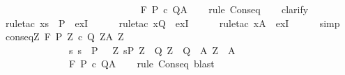 \begin{isabellebody}
\ \ \ \ \ \ \ \ \ \ \ \ \ \ {\isasymLongrightarrow}\isanewline
\ \ \ \ \ \ \ \ \ \ \ \ \ \ {\isasymGamma}{\isacharcomma}{\isasymTheta}{\isasymturnstile}\isactrlbsub {\isacharslash}F\isactrlesub \ P\ c\ Q{\isacharcomma}A{\isachardoublequoteclose}\isanewline
%
\isadelimproof
\ \ %
\endisadelimproof
%
\isatagproof
{}\isamarkupfalse%
\ {\isacharparenleft}rule\ Conseq{\isacharparenright}\isanewline
\ \ \isamarkupfalse%
\ clarify\isanewline
\ \ \isamarkupfalse%
\ {\isacharparenleft}rule{\isacharunderscore}tac\ x{\isacharequal}{\isachardoublequoteopen}{\isacharbraceleft}s{\isacharbraceright}\ {\isasyminter}\ P{\isachardoublequoteclose}\ \ exI{\isacharparenright}\ \ \isanewline
\ \ \isamarkupfalse%
\ {\isacharparenleft}rule{\isacharunderscore}tac\ x{\isacharequal}{\isachardoublequoteopen}Q{\isachardoublequoteclose}\ \ exI{\isacharparenright}\ \ \isanewline
\ \ \isamarkupfalse%
\ {\isacharparenleft}rule{\isacharunderscore}tac\ x{\isacharequal}{\isachardoublequoteopen}A{\isachardoublequoteclose}\ \ exI{\isacharparenright}\ \ \isanewline
\ \ \isamarkupfalse%
\ simp%
\endisatagproof
{\isafoldproof}%
%
\isadelimproof
\isanewline
%
\endisadelimproof
\isanewline
\isanewline
{}\isamarkupfalse%
\ conseq{\isacharcolon}{\isachardoublequoteopen}{\isasymlbrakk}{\isasymforall}Z{\isachardot}\ {\isasymGamma}{\isacharcomma}{\isasymTheta}{\isasymturnstile}\isactrlbsub {\isacharslash}F\isactrlesub \ {\isacharparenleft}P{\isacharprime}\ Z{\isacharparenright}\ c\ {\isacharparenleft}Q{\isacharprime}\ Z{\isacharparenright}{\isacharcomma}{\isacharparenleft}A{\isacharprime}\ Z{\isacharparenright}{\isacharsemicolon}\isanewline
\ \ \ \ \ \ \ \ \ \ \ \ \ \ {\isasymforall}s{\isachardot}\ s\ {\isasymin}\ P\ {\isasymlongrightarrow}\ {\isacharparenleft}{\isasymexists}\ Z{\isachardot}\ s{\isasymin}P{\isacharprime}\ Z\ {\isasymand}\ {\isacharparenleft}Q{\isacharprime}\ Z\ {\isasymsubseteq}\ Q{\isacharparenright}\ {\isasymand}\ {\isacharparenleft}A{\isacharprime}\ Z\ {\isasymsubseteq}\ A{\isacharparenright}{\isacharparenright}{\isasymrbrakk}\isanewline
\ \ \ \ \ \ \ \ \ \ \ \ \ \ {\isasymLongrightarrow}\isanewline
\ \ \ \ \ \ \ \ \ \ \ \ \ \ {\isasymGamma}{\isacharcomma}{\isasymTheta}{\isasymturnstile}\isactrlbsub {\isacharslash}F\isactrlesub \ P\ c\ Q{\isacharcomma}A{\isachardoublequoteclose}\isanewline
%
\isadelimproof
\ \ %
\endisadelimproof
%
\isatagproof
{}\isamarkupfalse%
\ {\isacharparenleft}rule\ Conseq{\isacharprime}{\isacharparenright}\ blast%

\end{isabellebody}
